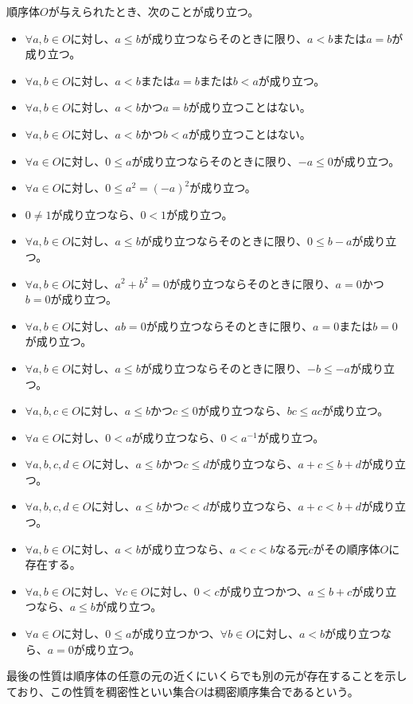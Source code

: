 \documentclass[dvipdfmx]{jsarticle}
\begin{document}
\begin{thm}\label{4.1.1.8} 順序体$O$が与えられたとき、次のことが成り立つ。
\begin{itemize}
\item
  $\forall a,b \in O$に対し、$a \leq b$が成り立つならそのときに限り、$a < b$または$a = b$が成り立つ。
\item
  $\forall a,b \in O$に対し、$a < b$または$a = b$または$b < a$が成り立つ。
\item
  $\forall a,b \in O$に対し、$a < b$かつ$a = b$が成り立つことはない。
\item
  $\forall a,b \in O$に対し、$a < b$かつ$b < a$が成り立つことはない。
\item
  $\forall a \in O$に対し、$0 \leq a$が成り立つならそのときに限り、$- a \leq 0$が成り立つ。
\item
  $\forall a \in O$に対し、$0 \leq a^{2} = ( - a)^{2}$が成り立つ。
\item
  $0 \neq 1$が成り立つなら、$0 < 1$が成り立つ。
\item
  $\forall a,b \in O$に対し、$a \leq b$が成り立つならそのときに限り、$0 \leq b - a$が成り立つ。
\item
  $\forall a,b \in O$に対し、$a^{2} + b^{2} = 0$が成り立つならそのときに限り、$a = 0$かつ$b = 0$が成り立つ。
\item
  $\forall a,b \in O$に対し、$ab = 0$が成り立つならそのときに限り、$a = 0$または$b = 0$が成り立つ。
\item
  $\forall a,b \in O$に対し、$a \leq b$が成り立つならそのときに限り、$- b \leq - a$が成り立つ。
\item
  $\forall a,b,c \in O$に対し、$a \leq b$かつ$c \leq 0$が成り立つなら、$bc \leq ac$が成り立つ。
\item
  $\forall a \in O$に対し、$0 < a$が成り立つなら、$0 < a^{- 1}$が成り立つ。
\item
  $\forall a,b,c,d \in O$に対し、$a \leq b$かつ$c \leq d$が成り立つなら、$a + c \leq b + d$が成り立つ。
\item
  $\forall a,b,c,d \in O$に対し、$a \leq b$かつ$c < d$が成り立つなら、$a + c < b + d$が成り立つ。
\item
  $\forall a,b \in O$に対し、$a < b$が成り立つなら、$a < c < b$なる元$c$がその順序体$O$に存在する。
\item
  $\forall a,b \in O$に対し、$\forall c \in O$に対し、$0 < c$が成り立つかつ、$a \leq b + c$が成り立つなら、$a \leq b$が成り立つ。
\item
  $\forall a \in O$に対し、$0 \leq a$が成り立つかつ、$\forall b \in O$に対し、$a < b$が成り立つなら、$a = 0$が成り立つ。
\end{itemize}
最後の性質は順序体の任意の元の近くにいくらでも別の元が存在することを示しており、この性質を稠密性といい集合$O$は稠密順序集合であるという。
\end{thm}
\end{document}
